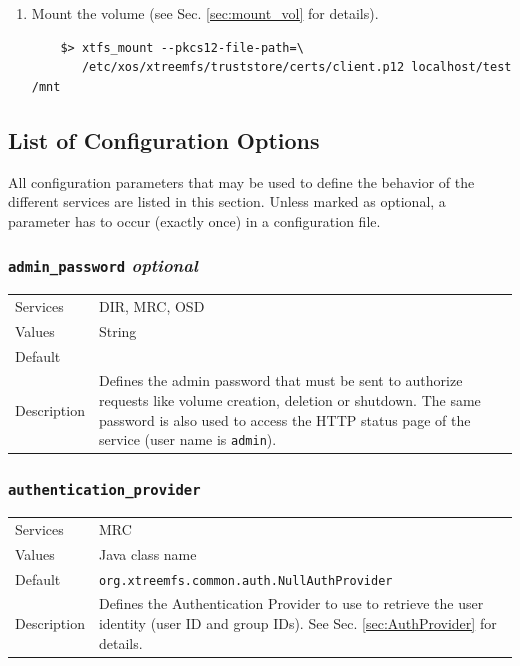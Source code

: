 \documentclass[a4paper,10pt]{book}
\begin{document}
\begin{enumerate}
 \item Mount the volume (see Sec. \ref{sec:mount_vol} for details).
	\begin{verbatim}
	$> xtfs_mount --pkcs12-file-path=\
	   /etc/xos/xtreemfs/truststore/certs/client.p12 localhost/test /mnt
	\end{verbatim}

\end{enumerate}


\subsection{List of Configuration Options}
\label{sec:config}

All configuration parameters that may be used to define the behavior of the different services are listed in this section. Unless marked as optional, a parameter has to occur (exactly once) in a configuration file.


\subsubsection{\texttt{admin\_password} \textit{optional}}
\begin{tabular}{lp{10cm}}
 Services & DIR, MRC, OSD\\
 Values   & String \\
 Default  & \\
 Description & Defines the admin password that must be sent to authorize requests like volume creation, deletion or shutdown. The same password is also used to access the HTTP status page of the service (user name is \texttt{admin}).
\end{tabular}

\subsubsection{\texttt{authentication\_provider}}
\begin{tabular}{lp{10cm}}
 Services & MRC\\
 Values   & Java class name \\
 Default  & \texttt{org.xtreemfs.common.auth.NullAuthProvider}\\
 Description & Defines the Authentication Provider to use to retrieve the user identity (user ID and group IDs). See Sec. \ref{sec:AuthProvider} for details.
\end{tabular}
\end{document}
